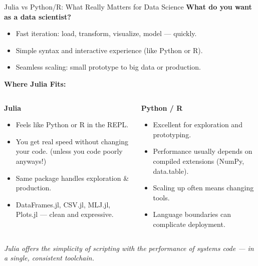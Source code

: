 \documentclass{beamer}
\begin{document}
\begin{frame}{Julia vs Python/R: What Really Matters for Data Science}
\textbf{What do you want as a data scientist?}

\begin{itemize}
    \item Fast iteration: load, transform, visualize, model — quickly.
    \item Simple syntax and interactive experience (like Python or R).
    \item Seamless scaling: small prototype to big data or production.
\end{itemize}

\vspace{0.4cm}
\textbf{Where Julia Fits:}

\begin{columns}
    \begin{column}{0.48\textwidth}
    \textbf{Julia}
    \scriptsize
    \begin{itemize}\setlength{\itemsep}{2pt}
        \item Feels like Python or R in the REPL.
        \item You get real speed without changing your code. (unless you code poorly anyways!)
        \item Same package handles exploration \& production.
        \item DataFrames.jl, CSV.jl, MLJ.jl, Plots.jl — clean and expressive.
    \end{itemize}
    \end{column}

    \begin{column}{0.48\textwidth}
    \textbf{Python / R}
    \scriptsize
    \begin{itemize}\setlength{\itemsep}{2pt}
        \item Excellent for exploration and prototyping.
        \item Performance usually depends on compiled extensions (NumPy, data.table).
        \item Scaling up often means changing tools.
        \item Language boundaries can complicate deployment.
    \end{itemize}
    \end{column}
\end{columns}

\vspace{0.3cm}
\textit{Julia offers the simplicity of scripting with the performance of systems code — in a single, consistent toolchain.}
\end{frame}
\end{document}
